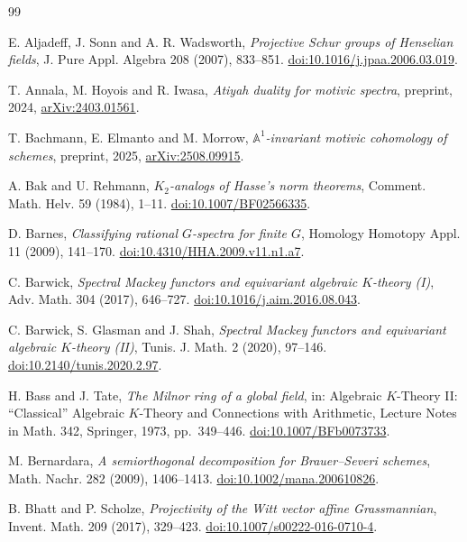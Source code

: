 \begin{thebibliography}{99}

 E. Aljadeff, J. Sonn and A. R. Wadsworth,
\emph{Projective Schur groups of Henselian fields},
J. Pure Appl. Algebra 208 (2007), 833--851.
\href{https://doi.org/10.1016/j.jpaa.2006.03.019}{doi:10.1016/j.jpaa.2006.03.019}.

 T. Annala, M. Hoyois and R. Iwasa,
\emph{Atiyah duality for motivic spectra}, preprint, 2024,
\href{https://arxiv.org/abs/2403.01561v2}{arXiv:2403.01561}.

 T. Bachmann, E. Elmanto and M. Morrow,
\emph{$\mathbb A^1$-invariant motivic cohomology of schemes}, preprint, 2025,
\href{https://arxiv.org/abs/2508.09915v1}{arXiv:2508.09915}.

 A. Bak and U. Rehmann,
\emph{$K_2$-analogs of Hasse's norm theorems},
Comment. Math. Helv. 59 (1984), 1--11.
\href{https://doi.org/10.1007/BF02566335}{doi:10.1007/BF02566335}.

 D. Barnes,
\emph{Classifying rational $G$-spectra for finite $G$},
Homology Homotopy Appl. 11 (2009), 141--170.
\href{https://doi.org/10.4310/HHA.2009.v11.n1.a7}{doi:10.4310/HHA.2009.v11.n1.a7}.

 C. Barwick,
\emph{Spectral Mackey functors and equivariant algebraic $K$-theory (I)},
Adv. Math. 304 (2017), 646--727.
\href{https://doi.org/10.1016/j.aim.2016.08.043}{doi:10.1016/j.aim.2016.08.043}.

 C. Barwick, S. Glasman and J. Shah,
\emph{Spectral Mackey functors and equivariant algebraic $K$-theory (II)},
Tunis. J. Math. 2 (2020), 97--146.
\href{https://doi.org/10.2140/tunis.2020.2.97}{doi:10.2140/tunis.2020.2.97}.

 H. Bass and J. Tate,
\emph{The Milnor ring of a global field},
in: Algebraic $K$-Theory II: ``Classical'' Algebraic $K$-Theory and Connections with Arithmetic, Lecture Notes in Math. 342, Springer, 1973, pp.~349--446.
\href{https://doi.org/10.1007/BFb0073733}{doi:10.1007/BFb0073733}.

 M. Bernardara,
\emph{A semiorthogonal decomposition for Brauer--Severi schemes},
Math. Nachr. 282 (2009), 1406--1413.
\href{https://doi.org/10.1002/mana.200610826}{doi:10.1002/mana.200610826}.

 B. Bhatt and P. Scholze,
\emph{Projectivity of the Witt vector affine Grassmannian},
Invent. Math. 209 (2017), 329--423.
\href{https://doi.org/10.1007/s00222-016-0710-4}{doi:10.1007/s00222-016-0710-4}.


\end{thebibliography}
